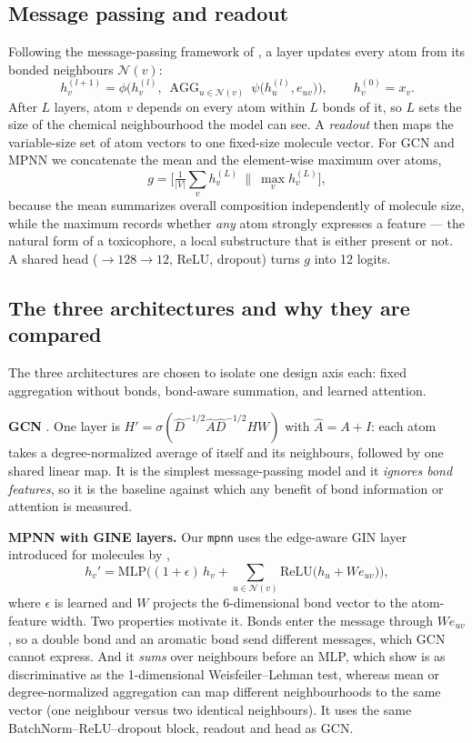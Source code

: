 \documentclass[conference]{IEEEtran}
\newcommand{\code}[1]{\texttt{\small #1}}
\begin{document}
\subsection{Message passing and readout}
Following the message-passing framework of \citet{gilmer2017mpnn}, a layer updates every atom
from its bonded neighbours $\mathcal N(v)$:
\begin{equation}
h_v^{(l+1)}=\phi\Big(h_v^{(l)},\ \mathop{\mathrm{AGG}}_{u\in\mathcal N(v)}\ \psi\big(h_u^{(l)},e_{uv}\big)\Big),
\qquad h_v^{(0)}=x_v .
\end{equation}
After $L$ layers, atom $v$ depends on every atom within $L$ bonds of it, so $L$ sets the size of
the chemical neighbourhood the model can see. A \emph{readout} then maps the variable-size set
of atom vectors to one fixed-size molecule vector. For GCN and MPNN we concatenate the mean and
the element-wise maximum over atoms,
\begin{equation}
g=\Big[\tfrac1{|V|}\textstyle\sum_{v}h_v^{(L)}\ \Big\|\ \max_{v}h_v^{(L)}\Big],
\end{equation}
because the mean summarizes overall composition independently of molecule size, while the
maximum records whether \emph{any} atom strongly expresses a feature --- the natural form of a
toxicophore, a local substructure that is either present or not. A shared head
($\to 128 \to 12$, ReLU, dropout) turns $g$ into 12 logits.

\subsection{The three architectures and why they are compared}
The three architectures are chosen to isolate one design axis each: fixed aggregation without
bonds, bond-aware summation, and learned attention.

\textbf{GCN} \citep{kipf2017gcn}. One layer is
$H'=\sigma(\hat D^{-1/2}\hat A\hat D^{-1/2}HW)$ with $\hat A=A+I$: each atom takes a
degree-normalized average of itself and its neighbours, followed by one shared linear map. It is
the simplest message-passing model and it \emph{ignores bond features}, so it is the baseline
against which any benefit of bond information or attention is measured.

\textbf{MPNN with GINE layers.} Our \code{mpnn} uses the edge-aware GIN layer introduced for
molecules by \citet{hu2020pretrain},
\begin{equation}
h_v'=\mathrm{MLP}\Big((1+\epsilon)\,h_v+\sum_{u\in\mathcal N(v)}\mathrm{ReLU}\big(h_u+W e_{uv}\big)\Big),
\end{equation}
where $\epsilon$ is learned and $W$ projects the 6-dimensional bond vector to the atom-feature
width. Two properties motivate it. Bonds enter the message through $We_{uv}$, so a double bond
and an aromatic bond send different messages, which GCN cannot express. And it \emph{sums} over
neighbours before an MLP, which \citet{xu2019gin} show is as discriminative as the
1-dimensional Weisfeiler--Lehman test, whereas mean or degree-normalized aggregation can map
different neighbourhoods to the same vector (one neighbour versus two identical neighbours). It
uses the same BatchNorm--ReLU--dropout block, readout and head as GCN.
\end{document}
